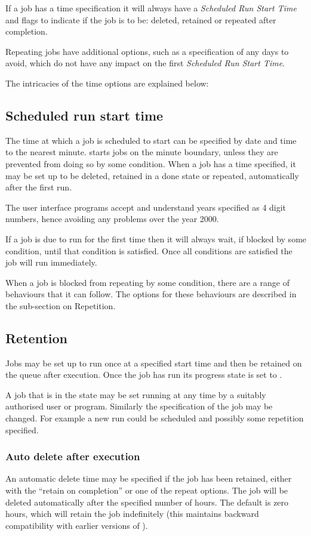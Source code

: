 If a job has a time specification it will always have a \textit{Scheduled Run Start Time} and flags to indicate if the job is
to be: deleted, retained or repeated after completion.

Repeating jobs have additional options, such as a specification of any days to avoid, which do not have any impact on the first
\textit{Scheduled Run Start Time}.

The intricacies of the time options are explained below:

\subsection{Scheduled run start time}
The time at which a job is scheduled to start can be specified by date and time to the nearest minute. \ProductName{} starts jobs on the minute
boundary, unless they are prevented from doing so by some condition. When a job has a time specified, it may be set up to be deleted,
retained in a done state or repeated, automatically after the first run.

The user interface programs accept and understand years specified as 4 digit numbers, hence avoiding any problems over the year 2000.

If a job is due to run for the first time then it will always wait, if blocked by some condition, until that condition is satisfied. Once all
conditions are satisfied the job will run immediately.

When a job is blocked from repeating by some condition, there are a range of behaviours that it can follow. The options for these
behaviours are described in the sub-section on Repetition.

\subsection{Retention}
Jobs may be set up to run once at a specified start time and then be retained on the queue after execution. Once the job has run its
progress state is set to .

A job that is in the  state may be set running at any time by a suitably authorised user or program. Similarly
the specification of the job may be changed. For example a new run could be scheduled and possibly some repetition specified.

\subsubsection{Auto delete after execution}
An automatic delete time may be specified if the job has been retained, either with the ``retain on completion'' or
one of the repeat options. The job will be deleted automatically after the specified number of hours. The default is zero hours, which will
retain the job indefinitely (this maintains backward compatibility with earlier versions of \ProductName{}).

